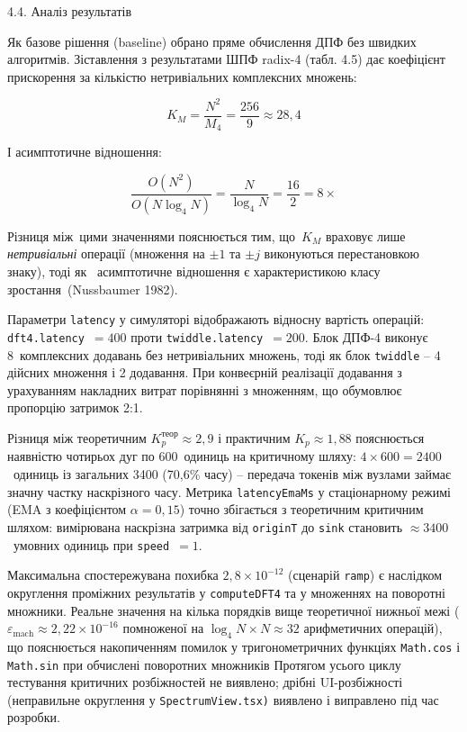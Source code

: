 \documentclass[
]{article}
\begin{document}
\protect{}\label{_Toc229681174}{}4.4. Аналіз результатів

Як базове рішення (baseline) обрано пряме обчислення ДПФ без швидких
алгоритмів. Зіставлення з результатами ШПФ radix-4 (табл. 4.5) дає
коефіцієнт прискорення за кількістю нетривіальних комплексних множень:

\[K_{M} = \frac{N^{2}}{M_{4}} = \frac{256}{9} \approx 28,4\]

І асимптотичне відношення:

\[\frac{O(N^{2})}{O(N\log_{4}N)} = \frac{N}{\log_{4}N} = \frac{16}{2} = 8 \times\]

Різниця між~цими значеннями пояснюється тим, що~\(K_{M}\) враховує лише
\emph{нетривіальні} операції (множення на \(\pm 1\) та \(\pm j\)
виконуються перестановкою знаку), тоді як~ асимптотичне відношення є
характеристикою класу зростання~(Nussbaumer 1982).

Параметри \texttt{latency} у симуляторі відображають відносну вартість
операцій: \texttt{dft4.latency}~\(= 400\) проти
\texttt{twiddle.latency}~\(= 200\). Блок ДПФ-4 виконує 8~комплексних
додавань без нетривіальних множень, тоді як блок \texttt{twiddle} -- 4
дійсних множення і 2 додавання. При конвеєрній реалізації додавання з
урахуванням накладних витрат порівнянні з множенням, що обумовлює
пропорцію затримок 2:1.

Різниця між теоретичним \(K_{p}^{\text{теор}} \approx 2,9\) і практичним
\(K_{p} \approx 1,88\) пояснюється наявністю чотирьох дуг по 600~одиниць
на критичному шляху: \(4 \times 600 = 2400\)~одиниць із загальних 3400
(70,6\% часу) -- передача токенів між вузлами займає значну частку
наскрізного часу. Метрика \texttt{latencyEmaMs} у стаціонарному режимі
(EMA з коефіцієнтом \(\alpha = 0,15\)) точно збігається з теоретичним
критичним шляхом: вимірювана наскрізна затримка від \texttt{originT} до
\texttt{sink} становить \(\approx 3400\)~умовних одиниць при
\texttt{speed}~\(= 1\).

Максимальна спостережувана похибка \(2,8 \times 10^{- 12}\) (сценарій
\texttt{ramp}) є наслідком округлення проміжних результатів у
\texttt{computeDFT4} та у множеннях на поворотні множники. Реальне
значення на кілька порядків вище теоретичної нижньої межі
(\(\varepsilon_{\text{mach}} \approx 2,22 \times 10^{- 16}\) помноженої
на \(\log_{4}N \times N \approx 32\) арифметичних операцій), що
пояснюється накопиченням помилок у тригонометричних функціях
\texttt{Math.cos} і \texttt{Math.sin} при обчислені поворотних множників
Протягом усього циклу тестування критичних розбіжностей не виявлено;
дрібні UI-розбіжності (неправильне округлення у
\texttt{SpectrumView.tsx}\texttt{)} виявлено і виправлено під час
розробки.
\end{document}
